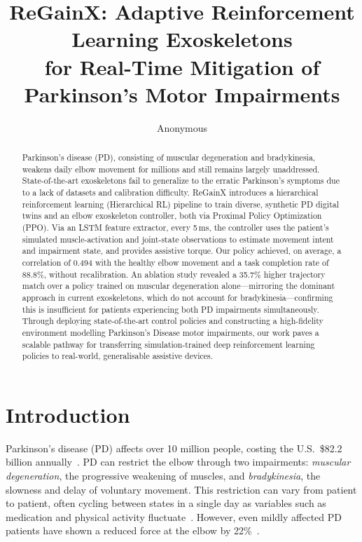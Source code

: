 \documentclass[letterpaper]{article} %
\title{ReGainX: Adaptive Reinforcement Learning Exoskeletons\\
for Real-Time Mitigation of Parkinson's Motor Impairments}
\author{Anonymous}
\begin{document}
\maketitle

\begin{abstract}
Parkinson's disease (PD), consisting of muscular degeneration and bradykinesia,
weakens daily elbow movement for millions and still remains largely unaddressed.
State-of-the-art exoskeletons fail to generalize to the erratic Parkinson's
symptoms due to a lack of datasets and calibration difficulty.
ReGainX introduces a hierarchical reinforcement learning (Hierarchical RL) pipeline to
train diverse, synthetic PD digital twins and an elbow exoskeleton controller, both via
Proximal Policy Optimization (PPO).
Via an LSTM feature extractor, every 5\,ms, the controller uses the patient's simulated
muscle-activation and joint-state observations to estimate movement intent and impairment
state, and provides assistive torque.
Our policy achieved, on average, a correlation of 0.494 with the healthy elbow
movement and a task completion rate of 88.8\%, without recalibration.
An ablation study revealed a 35.7\% higher trajectory match over a policy trained on
muscular degeneration alone---mirroring the dominant approach in current exoskeletons,
which do not account for bradykinesia---confirming this is insufficient for patients
experiencing both PD impairments simultaneously.
Through deploying state-of-the-art control policies and constructing a
high-fidelity environment modelling Parkinson's Disease motor impairments, our
work paves a scalable pathway for transferring simulation-trained deep
reinforcement learning policies to real-world, generalisable assistive devices.
\end{abstract}


\section{Introduction}
\label{sec:intro}

Parkinson's disease (PD) affects over 10 million people, costing the
U.S.\ \$82.2 billion annually~\citep{chaudhuri2025, parkinson2026}.
PD can restrict the elbow through two impairments: \emph{muscular degeneration},
the progressive weakening of muscles, and \emph{bradykinesia}, the slowness and
delay of voluntary movement.
This restriction can vary from patient to patient, often cycling between states
in a single day as variables such as medication and physical activity
fluctuate~\citep{ramesh2022}.
However, even mildly affected PD patients have shown a reduced force at the
elbow by 22\%~\citep{ingram2021}.
\end{document}
